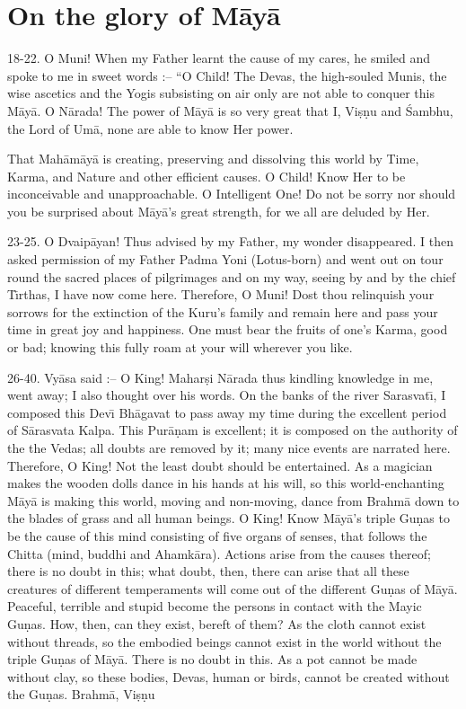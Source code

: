 \chapter{On the glory of M\=ay\=a}

18-22. O Muni! When my Father learnt the cause of my cares, he smiled and spoke to me in sweet words :-- ``O Child! The Devas, the high-souled Munis, the wise ascetics and the Yogis subsisting on air only are not able to conquer this M\=ay\=a. O N\=arada! The power of M\=ay\=a is so very great that I, Vi\d{s}\d{n}u and \'Sambhu, the Lord of Um\=a, none are able to know Her power.

That Mah\=am\=ay\=a is creating, preserving and dissolving this world by Time, Karma, and Nature and other efficient causes. O Child! Know Her to be inconceivable and unapproachable. O Intelligent One! Do not be sorry nor should you be surprised about M\=ay\=a's great strength, for we all are deluded by Her.

23-25. O Dvaip\=ayan! Thus advised by my Father, my wonder disappeared. I then asked permission of my Father Padma Yoni (Lotus-born) and went out on tour round the sacred places of pilgrimages and on my way, seeing by and by the chief T\={\i}rthas, I have now come here. Therefore, O Muni! Dost thou relinquish your sorrows for the extinction of the Kuru's family and remain here and pass your time in great joy and happiness. One must bear the fruits of one's Karma, good or bad; knowing this fully roam at your will wherever you like.

26-40. Vy\=asa said :-- O King! Mahar\d{s}i N\=arada thus kindling knowledge in me, went away; I also thought over his words. On the banks of the river Sarasvat\={\i}, I composed this Dev\={\i} Bh\=agavat to pass away my time during the excellent period of S\=arasvata Kalpa. This Pur\=a\d{n}am is excellent; it is composed on the authority of the the Vedas; all doubts are removed by it; many nice events are narrated here. Therefore, O King! Not the least doubt should be entertained. As a magician makes the wooden dolls dance in his hands at his will, so this world-enchanting M\=ay\=a is making this world, moving and non-moving, dance from Brahm\=a down to the blades of grass and all human beings. O King! Know M\=ay\=a's triple Gu\d{n}as to be the cause of this mind consisting of five organs of senses, that follows the Chitta (mind, buddhi and Ahamk\=ara). Actions arise from the causes thereof; there is no doubt in this; what doubt, then, there can arise that all these creatures of different temperaments will come out of the different Gu\d{n}as of M\=ay\=a. Peaceful, terrible and stupid become the persons in contact with the Mayic Gu\d{n}as. How, then, can they exist, bereft of them? As the cloth cannot exist without threads, so the embodied beings cannot exist in the world without the triple Gu\d{n}as of M\=ay\=a. There is no doubt in this. As a pot cannot be made without clay, so these bodies, Devas, human or birds, cannot be created without the Gu\d{n}as. Brahm\=a, Vi\d{s}\d{n}u

